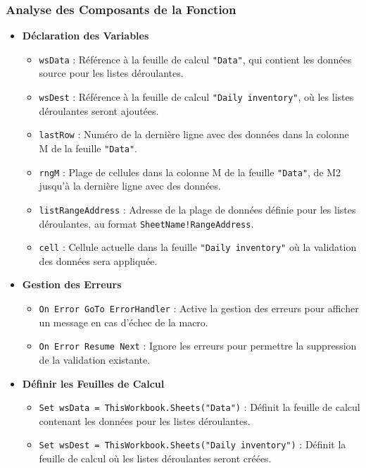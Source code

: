 \documentclass[a4paper, oneside, 12pt, final]{extreport}
\begin{document}
\subsubsection{Analyse des Composants de la Fonction}
\begin{itemize}

\item\textbf{Déclaration des Variables}

\begin{itemize}
    \item \texttt{wsData} : Référence à la feuille de calcul \texttt{"Data"}, qui contient les données source pour les listes déroulantes.
    \item \texttt{wsDest} : Référence à la feuille de calcul \texttt{"Daily inventory"}, où les listes déroulantes seront ajoutées.
    \item \texttt{lastRow} : Numéro de la dernière ligne avec des données dans la colonne M de la feuille \texttt{"Data"}.
    \item \texttt{rngM} : Plage de cellules dans la colonne M de la feuille \texttt{"Data"}, de M2 jusqu'à la dernière ligne avec des données.
    \item \texttt{listRangeAddress} : Adresse de la plage de données définie pour les listes déroulantes, au format \texttt{SheetName!RangeAddress}.
    \item \texttt{cell} : Cellule actuelle dans la feuille \texttt{"Daily inventory"} où la validation des données sera appliquée.
\end{itemize}

\item\textbf{Gestion des Erreurs}

\begin{itemize}
    \item \texttt{On Error GoTo ErrorHandler} : Active la gestion des erreurs pour afficher un message en cas d'échec de la macro.
    \item \texttt{On Error Resume Next} : Ignore les erreurs pour permettre la suppression de la validation existante.
\end{itemize}

\item\textbf{Définir les Feuilles de Calcul}

\begin{itemize}
    \item \texttt{Set wsData = ThisWorkbook.Sheets("Data")} : Définit la feuille de calcul contenant les données pour les listes déroulantes.
    \item \texttt{Set wsDest = ThisWorkbook.Sheets("Daily inventory")} : Définit la feuille de calcul où les listes déroulantes seront créées.
\end{itemize}


\end{itemize}
\end{document}
